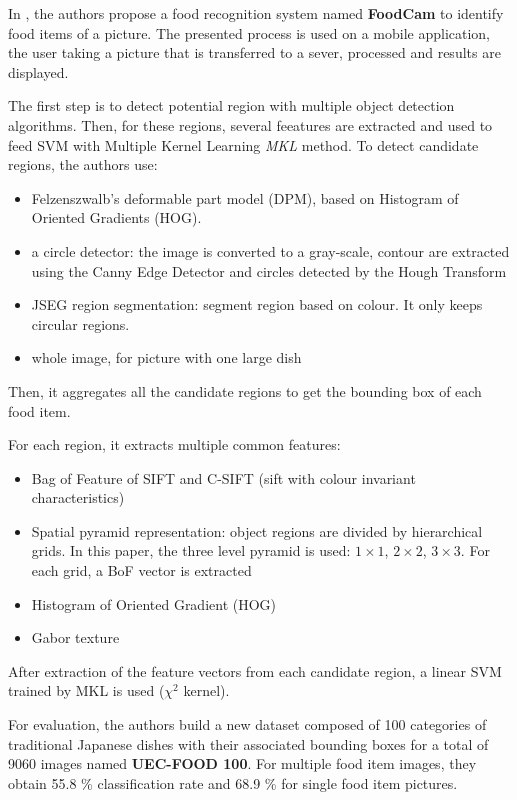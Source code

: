 In \cite{Matsuda2012a}, the authors propose a food recognition system named \textbf{FoodCam} to identify food items of a picture. The presented process is used on a mobile application, the user taking a picture that is transferred to a sever, processed and results are displayed.

The first step is to detect potential region with multiple object detection algorithms. Then, for these regions, several feeatures are extracted and used to feed SVM with Multiple Kernel Learning \textit{MKL} method. To detect candidate regions, the authors use:
\begin{itemize}
    \item Felzenszwalb’s deformable part model (DPM), based on Histogram of Oriented Gradients (HOG).
    \item a circle detector: the image is converted to a gray-scale, contour are extracted using the Canny Edge Detector and circles detected by the Hough Transform
    \item JSEG region segmentation: segment region based on colour. It only keeps circular regions.
    \item whole image, for picture with one large dish
\end{itemize}
Then, it aggregates all the candidate regions to get the bounding box of each food item.

For each region, it extracts multiple common features:
\begin{itemize}
    \item Bag of Feature of SIFT and C-SIFT (sift with colour invariant characteristics)
    \item Spatial pyramid representation: object regions are divided by hierarchical grids. In this paper, the three level pyramid is used: $1 \times 1$, $2 \times 2$, $3 \times 3$. For each grid, a BoF vector is extracted
    \item Histogram of Oriented Gradient (HOG)
    \item Gabor texture
\end{itemize}

After extraction of the feature vectors from each candidate region, a linear SVM trained by MKL is used ($\chi^2$ kernel).

For evaluation, the authors build a new dataset composed of 100 categories of traditional Japanese dishes with their associated bounding boxes for a total of 9060 images named \textbf{UEC-FOOD 100}. For multiple food item images, they obtain 55.8 \% classification rate and 68.9 \% for single food item pictures.

